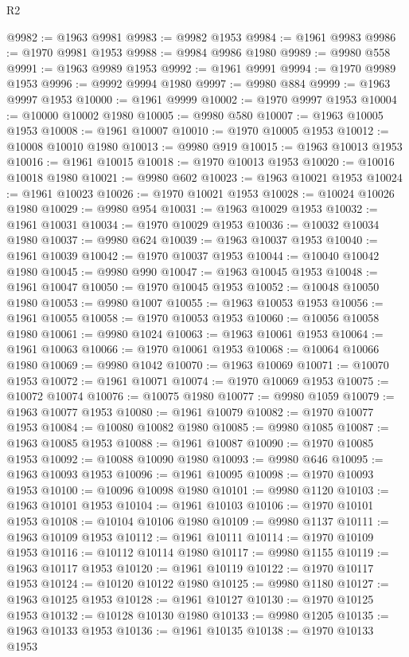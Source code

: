 \begin{lexlean}{R2}
\begin{coremodule}
@9982 := @1963 @9981
@9983 := @9982 @1953
@9984 := @1961 @9983
@9986 := @1970 @9981 @1953
@9988 := @9984 @9986 @1980
@9989 := @9980 @558
@9991 := @1963 @9989 @1953
@9992 := @1961 @9991
@9994 := @1970 @9989 @1953
@9996 := @9992 @9994 @1980
@9997 := @9980 @884
@9999 := @1963 @9997 @1953
@10000 := @1961 @9999
@10002 := @1970 @9997 @1953
@10004 := @10000 @10002 @1980
@10005 := @9980 @580
@10007 := @1963 @10005 @1953
@10008 := @1961 @10007
@10010 := @1970 @10005 @1953
@10012 := @10008 @10010 @1980
@10013 := @9980 @919
@10015 := @1963 @10013 @1953
@10016 := @1961 @10015
@10018 := @1970 @10013 @1953
@10020 := @10016 @10018 @1980
@10021 := @9980 @602
@10023 := @1963 @10021 @1953
@10024 := @1961 @10023
@10026 := @1970 @10021 @1953
@10028 := @10024 @10026 @1980
@10029 := @9980 @954
@10031 := @1963 @10029 @1953
@10032 := @1961 @10031
@10034 := @1970 @10029 @1953
@10036 := @10032 @10034 @1980
@10037 := @9980 @624
@10039 := @1963 @10037 @1953
@10040 := @1961 @10039
@10042 := @1970 @10037 @1953
@10044 := @10040 @10042 @1980
@10045 := @9980 @990
@10047 := @1963 @10045 @1953
@10048 := @1961 @10047
@10050 := @1970 @10045 @1953
@10052 := @10048 @10050 @1980
@10053 := @9980 @1007
@10055 := @1963 @10053 @1953
@10056 := @1961 @10055
@10058 := @1970 @10053 @1953
@10060 := @10056 @10058 @1980
@10061 := @9980 @1024
@10063 := @1963 @10061 @1953
@10064 := @1961 @10063
@10066 := @1970 @10061 @1953
@10068 := @10064 @10066 @1980
@10069 := @9980 @1042
@10070 := @1963 @10069
@10071 := @10070 @1953
@10072 := @1961 @10071
@10074 := @1970 @10069 @1953
@10075 := @10072 @10074
@10076 := @10075 @1980
@10077 := @9980 @1059
@10079 := @1963 @10077 @1953
@10080 := @1961 @10079
@10082 := @1970 @10077 @1953
@10084 := @10080 @10082 @1980
@10085 := @9980 @1085
@10087 := @1963 @10085 @1953
@10088 := @1961 @10087
@10090 := @1970 @10085 @1953
@10092 := @10088 @10090 @1980
@10093 := @9980 @646
@10095 := @1963 @10093 @1953
@10096 := @1961 @10095
@10098 := @1970 @10093 @1953
@10100 := @10096 @10098 @1980
@10101 := @9980 @1120
@10103 := @1963 @10101 @1953
@10104 := @1961 @10103
@10106 := @1970 @10101 @1953
@10108 := @10104 @10106 @1980
@10109 := @9980 @1137
@10111 := @1963 @10109 @1953
@10112 := @1961 @10111
@10114 := @1970 @10109 @1953
@10116 := @10112 @10114 @1980
@10117 := @9980 @1155
@10119 := @1963 @10117 @1953
@10120 := @1961 @10119
@10122 := @1970 @10117 @1953
@10124 := @10120 @10122 @1980
@10125 := @9980 @1180
@10127 := @1963 @10125 @1953
@10128 := @1961 @10127
@10130 := @1970 @10125 @1953
@10132 := @10128 @10130 @1980
@10133 := @9980 @1205
@10135 := @1963 @10133 @1953
@10136 := @1961 @10135
@10138 := @1970 @10133 @1953

\end{coremodule}
\end{lexlean}
